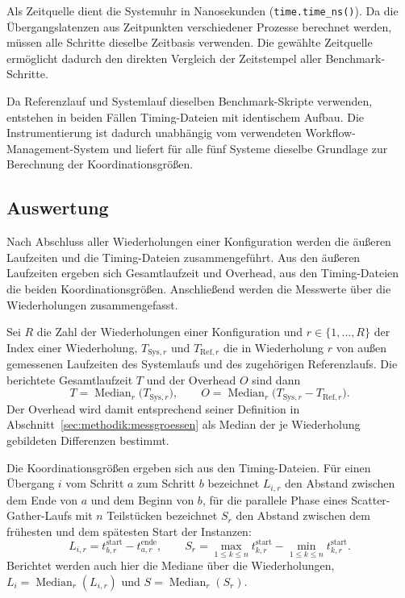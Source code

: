 Als Zeitquelle dient die Systemuhr in Nanosekunden
(\texttt{time.time\_ns()}). Da die Übergangslatenzen aus
Zeitpunkten verschiedener Prozesse berechnet werden, müssen alle
Schritte dieselbe Zeitbasis verwenden. Die gewählte Zeitquelle
ermöglicht dadurch den direkten Vergleich der Zeitstempel aller
Benchmark-Schritte.

Da Referenzlauf und Systemlauf dieselben Benchmark-Skripte
verwenden, entstehen in beiden Fällen Timing-Dateien mit
identischem Aufbau. Die Instrumentierung ist dadurch unabhängig
vom verwendeten Workflow-Management-System und liefert für alle
fünf Systeme dieselbe Grundlage zur Berechnung der
Koordinationsgrößen.

\subsection{Auswertung}
\label{sec:methodik:auswertung}

Nach Abschluss aller Wiederholungen einer Konfiguration werden die
äußeren Laufzeiten und die Timing-Dateien zusammengeführt. Aus den
äußeren Laufzeiten ergeben sich Gesamtlaufzeit und Overhead, aus
den Timing-Dateien die beiden Koordinationsgrößen. Anschließend
werden die Messwerte über die Wiederholungen zusammengefasst.

Sei $R$ die Zahl der Wiederholungen einer Konfiguration und
$r \in \{1,\ldots,R\}$ der Index einer Wiederholung,
$T_{\mathrm{Sys},r}$ und $T_{\mathrm{Ref},r}$ die in Wiederholung
$r$ von außen gemessenen Laufzeiten des Systemlaufs und des
zugehörigen Referenzlaufs. Die berichtete Gesamtlaufzeit $T$ und
der Overhead $O$ sind dann
\[
  T = \operatorname{Median}_{r}\bigl(T_{\mathrm{Sys},r}\bigr),
  \qquad
  O = \operatorname{Median}_{r}\bigl(T_{\mathrm{Sys},r}
      - T_{\mathrm{Ref},r}\bigr).
\]
Der Overhead wird damit entsprechend seiner Definition in
Abschnitt~\ref{sec:methodik:messgroessen} als Median der je
Wiederholung gebildeten Differenzen bestimmt.

Die Koordinationsgrößen ergeben sich aus den Timing-Dateien. Für
einen Übergang $i$ vom Schritt $a$ zum Schritt $b$ bezeichnet
$L_{i,r}$ den Abstand zwischen dem Ende von $a$ und dem Beginn von
$b$, für die parallele Phase eines Scatter-Gather-Laufs mit $n$
Teilstücken bezeichnet $S_r$ den Abstand zwischen dem frühesten und
dem spätesten Start der Instanzen:
\[
  L_{i,r} = t^{\text{start}}_{b,r} - t^{\text{ende}}_{a,r},
  \qquad
  S_r = \max_{1 \le k \le n} t^{\text{start}}_{k,r}
      - \min_{1 \le k \le n} t^{\text{start}}_{k,r}.
\]
Berichtet werden auch hier die Mediane über die Wiederholungen,
$L_i = \operatorname{Median}_{r}(L_{i,r})$ und
$S = \operatorname{Median}_{r}(S_r)$.

